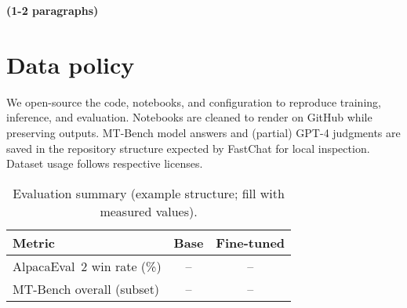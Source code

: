 \documentclass{assignment7_report}
\begin{document}
\textbf{(1-2 paragraphs)}


\section{Data policy}
\vspace*{-3mm}

We open-source the code, notebooks, and configuration to reproduce training, inference, and evaluation. Notebooks are cleaned to render on GitHub while preserving outputs. MT-Bench model answers and (partial) GPT-4 judgments are saved in the repository structure expected by FastChat for local inspection. Dataset usage follows respective licenses.


\begin{table}[h!]
\centering
\caption{Evaluation summary (example structure; fill with measured values).}
\label{tab:results}
\begin{tabular}{@{}lcc@{}}
\toprule
\textbf{Metric} & \textbf{Base} & \textbf{Fine-tuned} \\ \midrule
AlpacaEval~2 win rate (\%) & -- & -- \\
MT-Bench overall (subset) & -- & -- \\
\bottomrule
\end{tabular}
\end{table}





\end{document}
